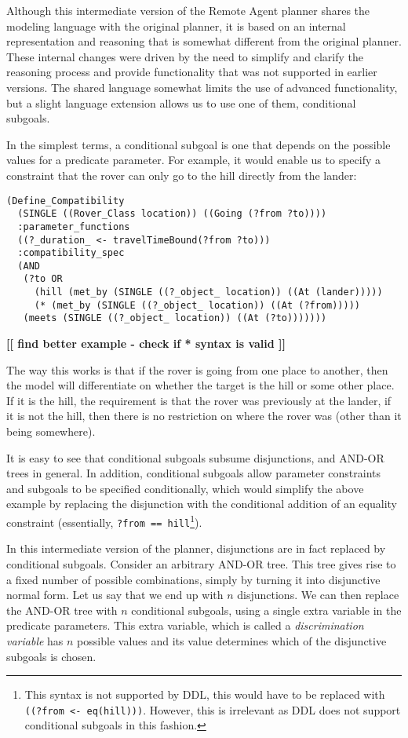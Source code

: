 
Although this intermediate version of the Remote Agent planner shares
the modeling language with the original planner, it is based on an
internal representation and reasoning that is somewhat different from
the original planner.  These internal changes were driven by the need
to simplify and clarify the reasoning process and provide
functionality that was not supported in earlier versions.  The shared
language somewhat limits the use of advanced functionality, but a
slight language extension allows us to use one of them, conditional
subgoals.

In the simplest terms, a conditional subgoal is one that depends on 
the possible values for a predicate parameter.  For example, it would 
enable us to specify a constraint that the rover can only go to the 
hill directly from the lander:
\begin{verbatim}
(Define_Compatibility
  (SINGLE ((Rover_Class location)) ((Going (?from ?to))))
  :parameter_functions
  ((?_duration_ <- travelTimeBound(?from ?to)))
  :compatibility_spec
  (AND
   (?to OR
     (hill (met_by (SINGLE ((?_object_ location)) ((At (lander)))))
     (* (met_by (SINGLE ((?_object_ location)) ((At (?from)))))
   (meets (SINGLE ((?_object_ location)) ((At (?to)))))))
\end{verbatim}

{\bf [[ find better example - check if * syntax is valid ]] }

The way this works is that if the rover is going from one place to
another, then the model will differentiate on whether the target is
the hill or some other place.  If it is the hill, the requirement is
that the rover was previously at the lander, if it is not the hill,
then there is no restriction on where the rover was (other than it
being somewhere).

It is easy to see that conditional subgoals subsume disjunctions, and
AND-OR trees in general.  In addition, conditional subgoals allow
parameter constraints and subgoals to be specified conditionally,
which would simplify the above example by replacing the disjunction
with the conditional addition of an equality constraint (essentially,
{\tt ?from == hill}\footnote{This syntax is not supported by DDL, this
would have to be replaced with {\tt ((?from <- eq(hill)))}.  However,
this is irrelevant as DDL does not support conditional subgoals in 
this fashion.}).

In this intermediate version of the planner, disjunctions are in fact
replaced by conditional subgoals.  Consider an arbitrary AND-OR tree. 
This tree gives rise to a fixed number of possible combinations,
simply by turning it into disjunctive normal form.  Let us say that we
end up with $n$ disjunctions.  We can then replace the AND-OR tree
with $n$ conditional subgoals, using a single extra variable in the
predicate parameters.  This extra variable, which is called a {\em
discrimination variable} has $n$ possible values and its value
determines which of the disjunctive subgoals is chosen.

